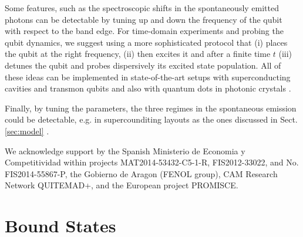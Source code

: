 \documentclass[aps,pra,twocolumn,floatfix,superscriptaddress]{revtex4-1}%
\begin{document}
Some features, such as the spectroscopic shifts in the spontaneously emitted photons can be detectable by tuning up and down the frequency of the qubit with respect to the band edge. For time-domain experiments and probing the qubit dynamics, we suggest using a more sophisticated protocol that (i) places the qubit at the right frequency, (ii) then excites it and after a finite time $t$ (iii) detunes the qubit and probes dispersively its excited state population. All of these ideas can be implemented in state-of-the-art setups with superconducting cavities and transmon qubits \cite{Liu2017} and also with quantum dots in photonic crystals \cite{Arcari2014,Sollner2015,Lodahl2015}.  

Finally, by tuning the parameters, the three regimes in the spontaneous emission could be detectable, e.g. in supercounditing layouts as the ones discussed in Sect. \ref{sec:model} \cite{Liu2017}.


\begin{acknowledgements}
We acknowledge 
support by the Spanish Ministerio de Economia y Competitividad within projects MAT2014-53432-C5-1-R, FIS2012-33022, and No. FIS2014-55867-P, the Gobierno
de Aragon (FENOL group), CAM Research Network QUITEMAD+,
and the European project PROMISCE.
\end{acknowledgements}

\appendix

\section{Bound States}\label{app:eigen}



\end{document}
